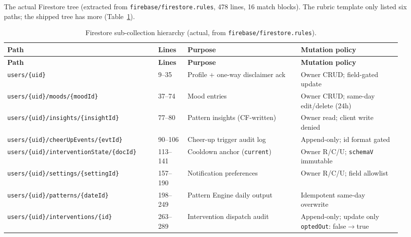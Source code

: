 \documentclass[11pt,a4paper]{article}
\begin{document}
The actual Firestore tree (extracted from \texttt{firebase/firestore.rules},
478 lines, 16 match blocks). The rubric template only listed six paths;
the shipped tree has more (Table~\ref{tab:firestore}).
{\small
\renewcommand{\arraystretch}{1.20}
\begin{longtable}{@{} >{\raggedright\arraybackslash}p{0.36\linewidth} p{0.07\linewidth} >{\raggedright\arraybackslash}p{0.27\linewidth} >{\raggedright\arraybackslash}p{0.24\linewidth} @{}}
\caption{Firestore sub-collection hierarchy (actual, from \texttt{firebase/\allowbreak{}firestore.rules}).}\label{tab:firestore}\\
\toprule
\textbf{Path} & \textbf{Lines} & \textbf{Purpose} & \textbf{Mutation policy} \\
\midrule
\endfirsthead
\toprule
\textbf{Path} & \textbf{Lines} & \textbf{Purpose} & \textbf{Mutation policy} \\
\midrule
\endhead
\texttt{users/\allowbreak{}\{uid\}}                                      & 9--35    & Profile + one-way disclaimer ack & Owner CRUD; field-gated update \\
\texttt{users/\allowbreak{}\{uid\}/\allowbreak{}moods/\allowbreak{}\{moodId\}}                     & 37--74   & Mood entries                     & Owner CRUD; same-day edit/delete (24h) \\
\texttt{users/\allowbreak{}\{uid\}/\allowbreak{}insights/\allowbreak{}\{insightId\}}               & 77--80   & Pattern insights (CF-written)    & Owner read; client write denied \\
\texttt{users/\allowbreak{}\{uid\}/\allowbreak{}cheerUpEvents/\allowbreak{}\{evtId\}}              & 90--106  & Cheer-up trigger audit log       & Append-only; id format gated \\
\texttt{users/\allowbreak{}\{uid\}/\allowbreak{}interventionState/\allowbreak{}\{docId\}}          & 113--141 & Cooldown anchor (\texttt{current})& Owner R/C/U; \texttt{schemaV} immutable \\
\texttt{users/\allowbreak{}\{uid\}/\allowbreak{}settings/\allowbreak{}\{settingId\}}               & 157--190 & Notification preferences         & Owner R/C/U; field allowlist \\
\texttt{users/\allowbreak{}\{uid\}/\allowbreak{}patterns/\allowbreak{}\{dateId\}}                  & 198--249 & Pattern Engine daily output      & Idempotent same-day overwrite \\
\texttt{users/\allowbreak{}\{uid\}/\allowbreak{}interventions/\allowbreak{}\{id\}}                 & 263--289 & Intervention dispatch audit      & Append-only; update only \texttt{optedOut}: false$\to$true \\

\end{longtable}}
\end{document}
